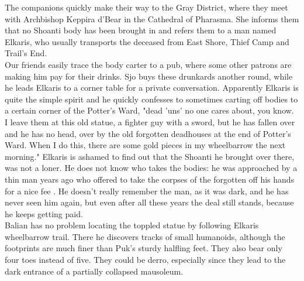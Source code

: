 The companions quickly make their way to the Gray District, where they meet with Archbishop Keppira d'Bear in the Cathedral of Pharasma. She informs them that no Shoanti body has been brought in and refers them to a man named Elkaris, who usually transports the deceased from East Shore, Thief Camp and Trail's End.\\

Our friends easily trace the body carter to a pub, where some other patrons are making him pay for their drinks. Sjo buys these drunkards another round, while he leads Elkaris to a corner table for a private conversation. Apparently Elkaris is quite the simple spirit and he quickly confesses to sometimes carting off bodies to a certain corner of the Potter's Ward, "dead 'uns' no one cares about, you know. I leave them at this old statue, a fighter guy with a sword, but he has fallen over and he has no head, over by the old forgotten deadhouses at the end of Potter's Ward. When I do this, there are some gold pieces in my wheelbarrow the next morning." Elkaris is ashamed to find out that the Shoanti he brought over there, was not a loner. He does not know who takes the bodies: he was approached by a thin man years ago who offered to take the corpses of the forgotten off his hands for a nice fee . He doesn't really remember the man, as it was dark, and he has never seen him again, but even after all these years the deal still stands, because he keeps getting paid.\\

Balian has no problem locating the toppled statue by following Elkaris wheelbarrow trail. There he discovers tracks of small humanoids, although the footprints are much finer than Puk's sturdy halfling feet. They also bear only four toes instead of five. They could be derro, especially since they lead to the dark entrance of a partially collapsed mausoleum.\\

